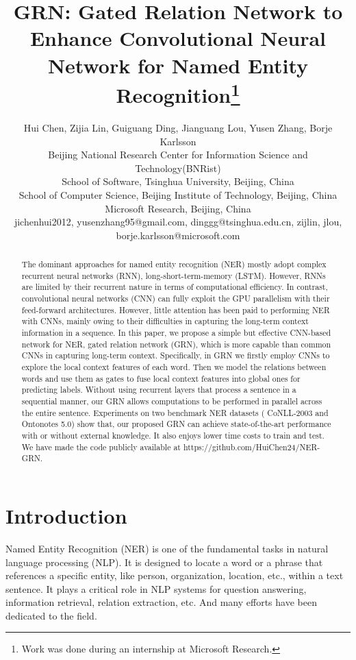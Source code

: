 \documentclass[letterpaper]{article} \usepackage{aaai19}  \usepackage{times}  \usepackage{helvet}  \usepackage{courier}  \usepackage{url}  \usepackage{graphicx}  \usepackage{amsmath}
\newcommand{\eg}{\text{e.g.,}}
\newcommand{\ie}{\text{i.e.,}}
\newcommand{\GRN}{GRN}
\begin{document}
\title{\GRN{}: Gated Relation Network to Enhance Convolutional Neural Network for Named Entity Recognition\thanks{Work was done during an internship at Microsoft Research.}}
\author{
Hui Chen, Zijia Lin, Guiguang Ding, Jianguang Lou, Yusen Zhang, Borje Karlsson \\
Beijing National Research Center for Information Science and Technology(BNRist) \\
School of Software, Tsinghua University, Beijing, China \\
School of Computer Science, Beijing Institute of Technology, Beijing, China\\
Microsoft Research, Beijing, China \\
jichenhui2012, yusenzhang95@gmail.com, dinggg@tsinghua.edu.cn, zijlin, jlou, borje.karlsson@microsoft.com
}
\maketitle
\begin{abstract}
The dominant approaches for named entity recognition (NER) mostly adopt complex recurrent neural networks (RNN), \eg{} long-short-term-memory (LSTM). However, RNNs are limited by their recurrent nature in terms of computational efficiency. In contrast, convolutional neural networks (CNN) can fully exploit the GPU parallelism with their feed-forward architectures. However, little attention has been paid to performing NER with CNNs, mainly owing to their difficulties in capturing the long-term context information in a sequence. In this paper, we propose a simple but effective CNN-based network for NER, \ie{} gated relation network (\GRN{}), which is more capable than common CNNs in capturing long-term context. Specifically, in \GRN{} we firstly employ CNNs to explore the local context features of each word. Then we model the relations between words and use them as gates to fuse local context features into global ones for predicting labels. Without using recurrent layers that process a sentence in a sequential manner, our \GRN{} allows computations to be performed in parallel across the entire sentence. Experiments on two benchmark NER datasets (\ie{} CoNLL-2003 and Ontonotes 5.0) show that, our proposed \GRN{} can achieve state-of-the-art performance with or without external knowledge. It also enjoys lower time costs to train and test. We have made the code publicly available at https://github.com/HuiChen24/NER-GRN.
\end{abstract}

\section{Introduction}
Named Entity Recognition (NER) is one of the fundamental tasks in natural language processing (NLP). It is designed to locate a word or a phrase that references a specific entity, like person, organization, location, etc., within a text sentence. It plays a critical role in NLP systems for question answering, information retrieval, relation extraction, etc. And many efforts have been dedicated to the field.
\end{document}
